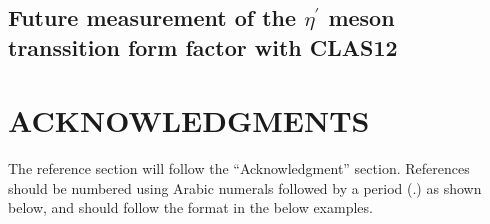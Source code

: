 \documentclass{aip-cp}
\begin{document}
\subsection{Future measurement of the $\eta^\prime$ meson transsition form factor with CLAS12}

\section{ACKNOWLEDGMENTS}
The reference section will follow the ``Acknowledgment'' section.  References should be numbered using Arabic numerals followed by a period (.) as shown below, and should follow the format in the below examples.


\nocite{*}
%
%
\end{document}
